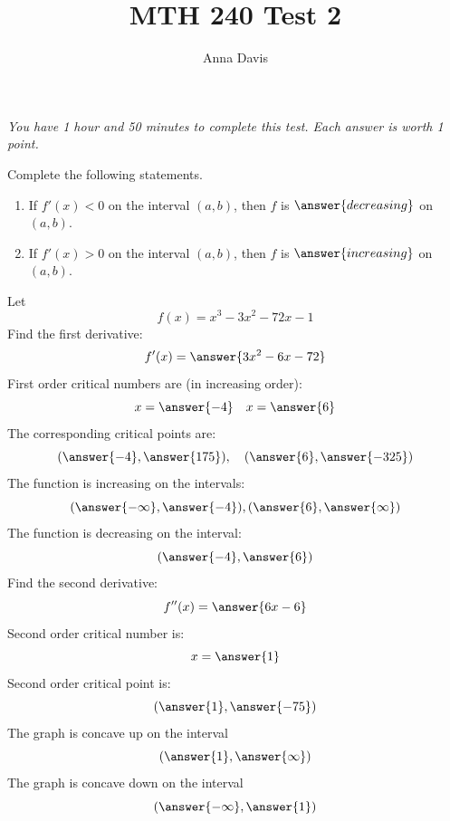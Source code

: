 \documentclass{ximera}
\author{Anna Davis} \title{MTH 240 Test 2}
\begin{document}
\begin{abstract}

\end{abstract}
\maketitle
 \textit{You have 1 hour and 50 minutes to complete this test.  Each answer is worth 1 point.}
\begin{problem}\label{prob:mth240exam2prob4}
Complete the following statements.
\begin{enumerate}
\item
If $f'(x)<0$ on the interval $(a, b)$, then $f$ is $\answer{decreasing}$ on $(a, b)$.
\item
If $f'(x)>0$ on the interval $(a, b)$, then $f$ is $\answer{increasing}$ on $(a, b)$.
\end{enumerate}
\end{problem}

\begin{problem}\label{prob:mth240exam2prob1}
Let $$f(x)=x^3-3x^2-72x-1$$
Find the first derivative:
$$f'(x)=\answer{3x^2-6x-72}$$
First order critical numbers are (in increasing order):
$$x=\answer{-4}\quad x=\answer{6}$$
The corresponding critical points are:
$$(\answer{-4}, \answer{175}),\quad (\answer{6}, \answer{-325})$$
The function is increasing on the intervals:
$$(\answer{-\infty},\answer{-4}), (\answer{6}, \answer{\infty})$$
The function is decreasing on the interval:
$$(\answer{-4},\answer{6})$$
Find the second derivative:
$$f''(x)=\answer{6x-6}$$
Second order critical number is:
$$x=\answer{1}$$
Second order critical point is:
$$(\answer{1}, \answer{-75})$$
The graph is concave up on the interval
$$(\answer{1}, \answer{\infty})$$
The graph is concave down on the interval
$$(\answer{-\infty}, \answer{1})$$
\end{problem}
\end{document}

